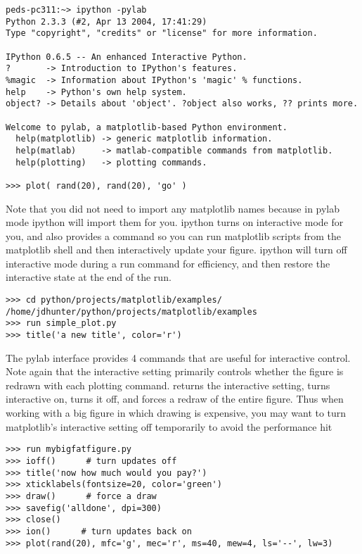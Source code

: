 \documentclass[twoside]{book}
\begin{document}
\begin{lstlisting}
peds-pc311:~> ipython -pylab
Python 2.3.3 (#2, Apr 13 2004, 17:41:29) 
Type "copyright", "credits" or "license" for more information.

IPython 0.6.5 -- An enhanced Interactive Python.
?       -> Introduction to IPython's features.
%magic  -> Information about IPython's 'magic' % functions.
help    -> Python's own help system.
object? -> Details about 'object'. ?object also works, ?? prints more.

Welcome to pylab, a matplotlib-based Python environment.
  help(matplotlib) -> generic matplotlib information.
  help(matlab)     -> matlab-compatible commands from matplotlib.
  help(plotting)   -> plotting commands.

>>> plot( rand(20), rand(20), 'go' )
\end{lstlisting}

Note that you did not need to import any matplotlib names because in
pylab mode ipython will import them for you.  ipython turns on
interactive mode for you, and also provides a  command so
you can run matplotlib scripts from the matplotlib shell and then
interactively update your figure.  ipython will turn off interactive
mode during a run command for efficiency, and then restore the
interactive state at the end of the run.

\begin{lstlisting}
>>> cd python/projects/matplotlib/examples/
/home/jdhunter/python/projects/matplotlib/examples
>>> run simple_plot.py
>>> title('a new title', color='r')
\end{lstlisting}

The pylab interface provides 4 commands that are useful for
interactive control.  Note again that the interactive setting
primarily controls whether the figure is redrawn with each plotting
command.   returns the interactive setting,
 turns interactive on,  turns it off, and
 forces a redraw of the entire figure.  Thus when working
with a big figure in which drawing is expensive, you may want to turn
matplotlib's interactive setting off temporarily to avoid the
performance hit

\begin{lstlisting}
>>> run mybigfatfigure.py
>>> ioff()      # turn updates off
>>> title('now how much would you pay?')
>>> xticklabels(fontsize=20, color='green')
>>> draw()      # force a draw
>>> savefig('alldone', dpi=300)
>>> close()
>>> ion()      # turn updates back on
>>> plot(rand(20), mfc='g', mec='r', ms=40, mew=4, ls='--', lw=3)
\end{lstlisting}
\end{document}
